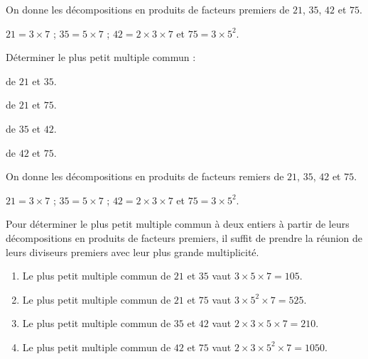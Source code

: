 \begin{exercice*}
    On donne les décompositions en produits de facteurs premiers de $21$, $35$, $42$ et $75$.

    $21=3\times 7$ ; $35=5\times 7$ ; $42=2\times 3\times 7$ et $75=3\times 5^2$.

    Déterminer le plus petit multiple commun :
    \begin{enumerate}
        \setlength{\columnseprule}{0pt}
        \begin{multicols}{2}        
            \item de $21$ et $35$.
            \item de $21$ et $75$.
            \item de $35$ et $42$.
            \item de $42$ et $75$.
        \end{multicols}
    \end{enumerate}    
\end{exercice*}
\begin{corrige}
    On donne les décompositions en produits de facteurs remiers de $21$, $35$, $42$ et $75$.

    $21=3\times 7$ ; $35=5\times 7$ ; $42=2\times 3\times 7$ et $75=3\times 5^2$.

    Pour déterminer le plus petit multiple commun à deux entiers à partir de leurs décompositions en produits de facteurs premiers,
    il suffit de prendre la réunion de leurs diviseurs premiers avec leur plus grande multiplicité.

    \begin{enumerate}
        \item Le plus petit multiple commun de $21$ et $35$ vaut $3\times 5\times 7 = 105$.
        \item Le plus petit multiple commun de $21$ et $75$ vaut $3\times 5^2\times 7 = 525$.
        \item Le plus petit multiple commun de $35$ et $42$ vaut $2\times 3\times 5\times 7 = 210$.
        \item Le plus petit multiple commun de $42$ et $75$ vaut $2\times 3\times 5^2\times 7 = \num{1050}$.
    \end{enumerate}    
\end{corrige}

